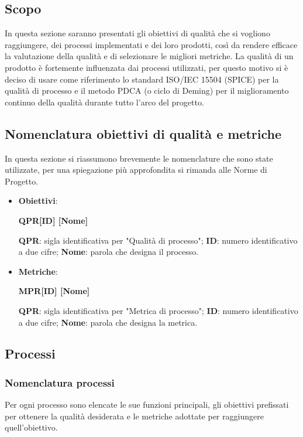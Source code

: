 \documentclass[../piano_di_qualifica.tex]{subfiles}
\begin{document}
\subsection{Scopo}
In questa sezione saranno presentati gli obiettivi di qualità che si vogliono raggiungere, dei processi implementati e dei loro prodotti, così da rendere efficace la valutazione della qualità e di selezionare le migliori metriche.
La qualità di un prodotto è fortemente influenzata dai processi utilizzati, per questo motivo si è deciso di usare come riferimento lo standard ISO/IEC 15504 (SPICE) per la qualità di processo e il metodo PDCA (o ciclo di Deming) per il miglioramento continuo della qualità durante tutto l'arco del progetto.

\subsection{Nomenclatura obiettivi di qualità e metriche}
In questa sezione si riassumono brevemente le nomenclature che sono state utilizzate, per una spiegazione più approfondita si rimanda alle Norme di Progetto.

\begin{itemize}
	\item \textbf{Obiettivi}:
	      \begin{center}
		      \textbf{QPR[ID] [Nome]}
	      \end{center}
	      \subitem \textbf{QPR}: sigla identificativa per "Qualità di processo";
	      \subitem \textbf{ID}: numero identificativo a due cifre;
	      \subitem \textbf{Nome}: parola che designa il processo.

	\item \textbf{Metriche}:
	      \begin{center}
		      \textbf{MPR[ID] [Nome]}
	      \end{center}
	      \subitem \textbf{QPR}: sigla identificativa per "Metrica di processo";
	      \subitem \textbf{ID}: numero identificativo a due cifre;
	      \subitem \textbf{Nome}: parola che designa la metrica.
\end{itemize}

\subsection{Processi}

\subsubsection{Nomenclatura processi}
Per ogni processo sono elencate le sue funzioni principali, gli obiettivi prefissati per ottenere la qualità desiderata e le metriche adottate per raggiungere quell’obiettivo.
\end{document}
